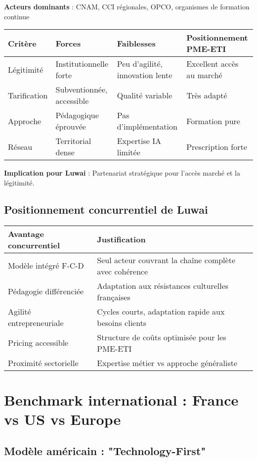 \textbf{Acteurs dominants} : CNAM, CCI régionales, OPCO, organismes de formation continue

\begin{longtable}{@{}p{3cm}p{4cm}p{4cm}p{4cm}@{}}
\toprule
\textbf{Critère} & \textbf{Forces} & \textbf{Faiblesses} & \textbf{Positionnement PME-ETI} \\
\midrule
Légitimité & Institutionnelle forte & Peu d'agilité, innovation lente & Excellent accès au marché \\
Tarification & Subventionnée, accessible & Qualité variable & Très adapté \\
Approche & Pédagogique éprouvée & Pas d'implémentation & Formation pure \\
Réseau & Territorial dense & Expertise IA limitée & Prescription forte \\
\bottomrule
\end{longtable}

\textbf{Implication pour Luwai} : Partenariat stratégique pour l'accès marché et la légitimité.

\subsection{Positionnement concurrentiel de Luwai}

\begin{longtable}{@{}p{4cm}p{10cm}@{}}
\toprule
\textbf{Avantage concurrentiel} & \textbf{Justification} \\
\midrule
Modèle intégré F-C-D & Seul acteur couvrant la chaîne complète avec cohérence \\
Pédagogie différenciée & Adaptation aux résistances culturelles françaises \\
Agilité entrepreneuriale & Cycles courts, adaptation rapide aux besoins clients \\
Pricing accessible & Structure de coûts optimisée pour les PME-ETI \\
Proximité sectorielle & Expertise métier vs approche généraliste \\
\bottomrule
\end{longtable}

\section{Benchmark international : France vs US vs Europe}

\subsection{Modèle américain : "Technology-First"}

